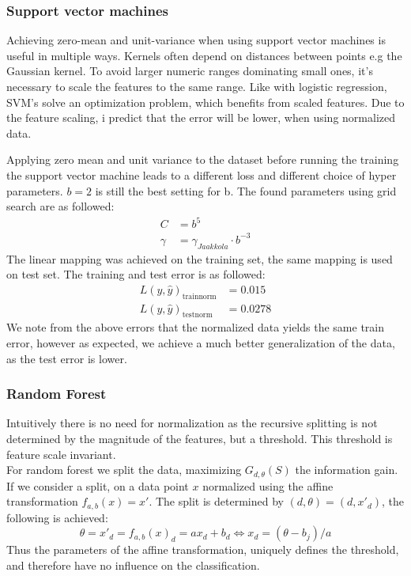 \documentclass{article}
\begin{document}
\subsubsection{Support vector machines}
Achieving zero-mean and unit-variance when using support vector machines is useful in multiple ways. Kernels often depend on distances between points e.g the Gaussian kernel. To avoid larger numeric ranges dominating small ones, it's necessary to scale the features to the same range. Like with logistic regression, SVM's solve an optimization problem, which benefits from scaled features. Due to the feature scaling, i predict that the error will be lower, when using normalized data.
%

Applying zero mean and unit variance to the dataset before running the training the support vector machine leads to a different loss and different choice of hyper parameters. $b=2$ is still the best setting for b. The found parameters using grid search are as followed:
\begin{align*}
C &= b^5 \\
\gamma &= \gamma_{Jaakkola} \cdot b^{-3}
\end{align*}
The linear mapping was achieved on the training set, the same mapping is used on test set. The training and test error is as followed:
\begin{align*}
L(y,\hat{y})_{\text{trainnorm}} &= 0.015 \\
L(y,\hat{y})_{\text{testnorm}} &= 0.0278
\end{align*}
We note from the above errors that the normalized data yields the same train error, however as expected, we achieve a much better generalization of the data, as the test error is lower.
\subsubsection{Random Forest}
Intuitively there is no need for normalization as the recursive splitting is not determined by the magnitude of the features, but a threshold. This threshold is feature scale invariant. \\
For random forest we split the data, maximizing $G_{d,\theta}(S)$ the information gain. If we consider a split, on a data point $x$ normalized using the affine transformation  $f_{a,b}(x) = x'$. The split is determined by $(d,\theta)=(d,x'_d)$, the following is achieved:
\begin{equation}
\theta = x'_d = f_{a,b}(x)_d = ax_d + b_d \Leftrightarrow
x_d = (\theta -b_j)/a
\end{equation}
Thus the parameters of the affine transformation, uniquely defines the threshold, and therefore have no influence on the classification.
\end{document}
